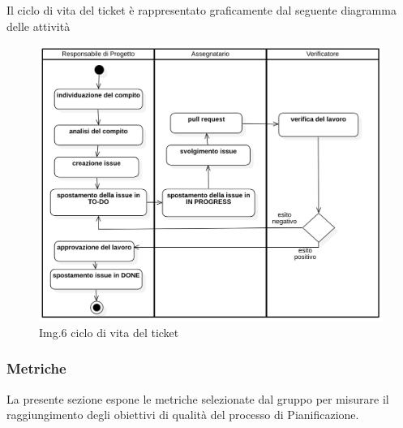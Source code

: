 			Il ciclo di vita del ticket è rappresentato graficamente dal seguente diagramma delle attività
			\begin{figure}[H]
    				\centering
    				\includegraphics[width=1.0\textwidth]{res/images/ciclo_di_vita_del_ticket.png}
				\caption{Img.6 ciclo di vita del ticket}
				\label{fig:Img.6 ciclo di vita del ticket}
			\end{figure}
		\subsubsection{Metriche}
			La presente sezione espone le metriche selezionate dal gruppo per misurare il raggiungimento degli obiettivi di qualità del processo di Pianificazione.
